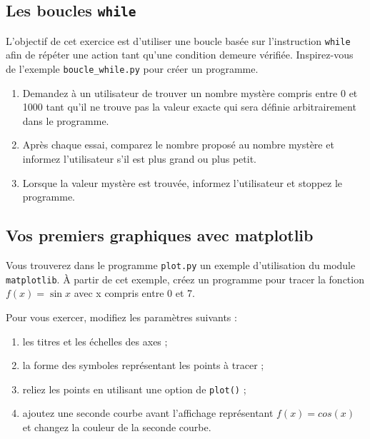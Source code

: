 \subsection{Les boucles  \texttt{while}}

L'objectif de  cet exercice  est d'utiliser une  boucle basée sur l'instruction
\texttt{while}
afin  de  répéter  une  action tant  qu'une  condition demeure  vérifiée.
Inspirez-vous de  l'exemple \texttt{boucle\_while.py}  pour créer  un
programme.

\begin{enumerate}
\item Demandez à  un utilisateur de trouver un  nombre mystère compris
  entre 0 et 1000  tant qu'il ne trouve pas la  valeur exacte qui sera
  définie arbitrairement dans le programme.

\item  Après  chaque essai,  comparez  le  nombre proposé  au  nombre
  mystère et informez l'utilisateur s'il est plus grand ou plus petit.

\item Lorsque la valeur mystère est trouvée, informez l'utilisateur et
  stoppez le programme.

\end{enumerate}



\subsection{Vos premiers graphiques avec matplotlib}

Vous  trouverez   dans  le   programme  \texttt{plot.py}   un  exemple
d'utilisation du  module \texttt{matplotlib}. À partir  de cet exemple,
créez  un programme  pour  tracer  la fonction  $f(x)=\sin  x$ avec  x
compris entre 0 et 7.

Pour vous exercer, modifiez les paramètres suivants :

\begin{enumerate}
\item les titres et les échelles des axes ;

\item la forme des  symboles représentant les points à tracer ;

\item reliez les points en utilisant une option de \texttt{plot()} ;

\item ajoutez une seconde courbe avant l'affichage représentant $f(x)=cos(x)$ et changez la couleur
  de la seconde courbe.


\end{enumerate}



